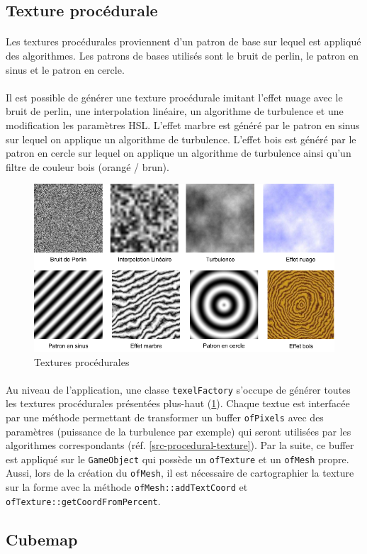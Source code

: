 \subsection{Texture procédurale}
\paragraph{} Les textures procédurales proviennent d'un patron de base sur lequel est appliqué des algorithmes. Les patrons de bases utilisés sont le bruit de perlin, le patron en sinus et le patron en cercle.
\paragraph{} Il est possible de générer une texture procédurale imitant l'effet nuage avec le bruit de perlin, une interpolation linéaire, un algorithme de turbulence et une modification les paramètres HSL. L'effet marbre est généré par le patron en sinus sur lequel on applique un algorithme de turbulence. L'effet bois est généré par le patron en cercle sur lequel on applique un algorithme de turbulence ainsi qu'un filtre de couleur bois (orangé / brun).
\begin{figure}[H]
\centering
\includegraphics[width=\textwidth]{img/infog-image-procedural-texture.png}
\caption{Textures procédurales}\label{fig-procedural-texture}
\end{figure}
\paragraph{} Au niveau de l'application, une classe \texttt{texelFactory} s'occupe de générer toutes les textures procédurales présentées plus-haut (\ref{fig-procedural-texture}).  Chaque textue est interfacée par une méthode permettant de transformer un buffer \texttt{ofPixels} avec des paramètres (puissance de la turbulence par exemple) qui seront utilisées par les algorithmes correspondants (réf. \ref{src-procedural-texture}). Par la suite, ce buffer est appliqué sur le \texttt{GameObject} qui possède un \texttt{ofTexture} et un \texttt{ofMesh} propre. Aussi, lors de la création du \texttt{ofMesh}, il est nécessaire de cartographier la texture sur la forme avec la méthode \texttt{ofMesh::addTextCoord} et \texttt{ofTexture::getCoordFromPercent}.
\subsection{Cubemap}